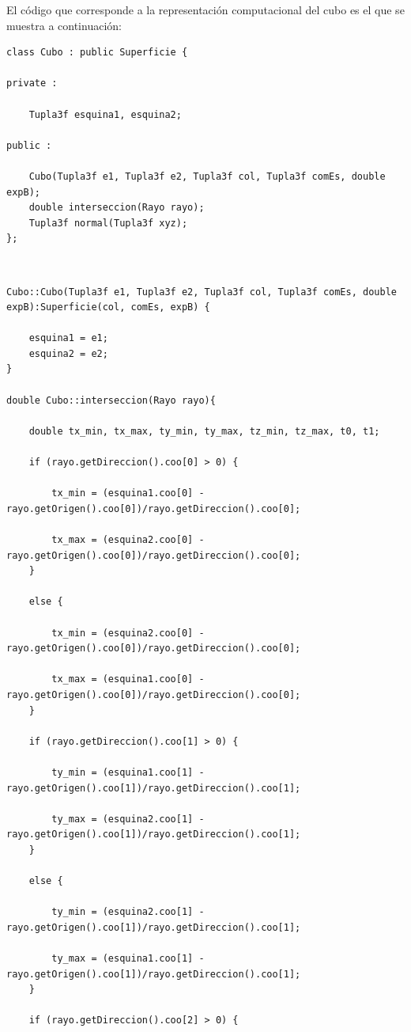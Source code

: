El código que corresponde a la representación computacional del cubo es el que se muestra a continuación:
${ }$\\

\begin{lstlisting}[style=Consola]
class Cubo : public Superficie {

private :

	Tupla3f esquina1, esquina2;

public :

	Cubo(Tupla3f e1, Tupla3f e2, Tupla3f col, Tupla3f comEs, double expB);
	double interseccion(Rayo rayo);
	Tupla3f normal(Tupla3f xyz);
};
\end{lstlisting}
${ }$\\

\begin{lstlisting}[style=Consola]
Cubo::Cubo(Tupla3f e1, Tupla3f e2, Tupla3f col, Tupla3f comEs, double expB):Superficie(col, comEs, expB) {

	esquina1 = e1;
	esquina2 = e2;
}

double Cubo::interseccion(Rayo rayo){

	double tx_min, tx_max, ty_min, ty_max, tz_min, tz_max, t0, t1;

	if (rayo.getDireccion().coo[0] > 0) {
	
		tx_min = (esquina1.coo[0] - rayo.getOrigen().coo[0])/rayo.getDireccion().coo[0];
		
		tx_max = (esquina2.coo[0] - rayo.getOrigen().coo[0])/rayo.getDireccion().coo[0];
	}
	
	else {
	
		tx_min = (esquina2.coo[0] - rayo.getOrigen().coo[0])/rayo.getDireccion().coo[0];
		
		tx_max = (esquina1.coo[0] - rayo.getOrigen().coo[0])/rayo.getDireccion().coo[0];
	}

	if (rayo.getDireccion().coo[1] > 0) {
	
		ty_min = (esquina1.coo[1] - rayo.getOrigen().coo[1])/rayo.getDireccion().coo[1];
		
		ty_max = (esquina2.coo[1] - rayo.getOrigen().coo[1])/rayo.getDireccion().coo[1];
	}
	
	else {
	
		ty_min = (esquina2.coo[1] - rayo.getOrigen().coo[1])/rayo.getDireccion().coo[1];
		
		ty_max = (esquina1.coo[1] - rayo.getOrigen().coo[1])/rayo.getDireccion().coo[1];
	}

	if (rayo.getDireccion().coo[2] > 0) {
	

\end{lstlisting}

